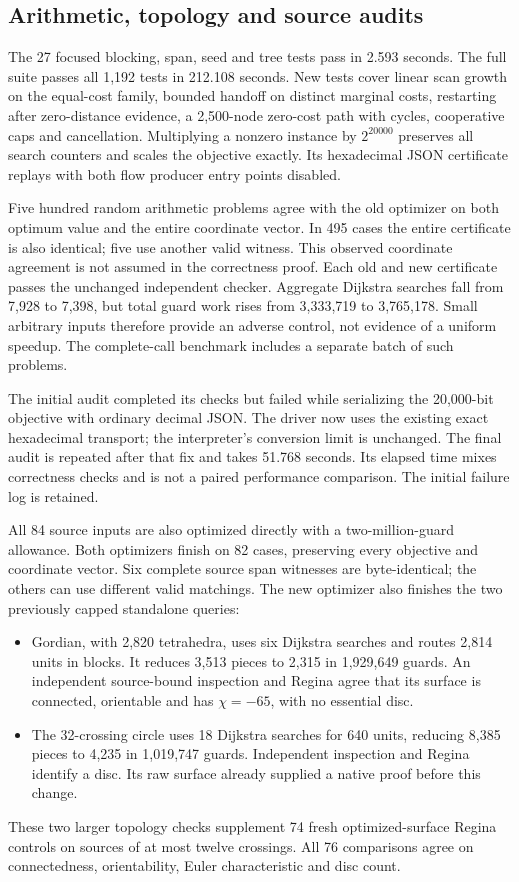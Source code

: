 \subsection{Arithmetic, topology and source audits}

The 27 focused blocking, span, seed and tree tests pass in 2.593 seconds.
The full suite passes all 1,192 tests in 212.108 seconds. New tests cover
linear scan growth on the equal-cost family, bounded handoff on distinct
marginal costs, restarting after zero-distance evidence, a 2,500-node
zero-cost path with cycles, cooperative caps and cancellation. Multiplying
a nonzero instance by $2^{20000}$ preserves all search counters and scales
the objective exactly. Its hexadecimal JSON certificate replays with both
flow producer entry points disabled.

Five hundred random arithmetic problems agree with the old optimizer on
both optimum value and the entire coordinate vector. In 495 cases the
entire certificate is also identical; five use another valid witness.
This observed coordinate agreement is not assumed in the
correctness proof. Each old and new certificate passes the unchanged
independent checker. Aggregate Dijkstra searches fall from 7,928 to 7,398,
but total guard work rises from 3,333,719 to 3,765,178. Small arbitrary
inputs therefore provide an adverse control, not evidence of a uniform
speedup. The complete-call benchmark includes a separate batch of such
problems.

The initial audit completed its checks but failed while serializing the
20,000-bit objective with ordinary decimal JSON. The driver now uses the
existing exact hexadecimal transport; the interpreter's conversion limit
is unchanged. The final audit is repeated after that fix and takes
51.768 seconds. Its elapsed time mixes correctness checks and is not a
paired performance comparison. The initial failure log is retained.

All 84 source inputs are also optimized directly with a two-million-guard
allowance. Both optimizers finish on 82 cases, preserving every objective
and coordinate vector. Six complete source span witnesses are byte-identical;
the others can use different valid matchings. The new optimizer also
finishes the two previously capped standalone queries:
\begin{itemize}
\item Gordian, with 2,820 tetrahedra, uses six Dijkstra searches and routes
      2,814 units in blocks. It reduces 3,513 pieces to 2,315 in 1,929,649
      guards. An independent source-bound inspection and Regina agree
      that its surface is connected, orientable and has $\chi=-65$,
      with no essential disc.
\item The 32-crossing circle uses 18 Dijkstra searches for 640 units,
      reducing 8,385 pieces to 4,235 in 1,019,747 guards. Independent
      inspection and Regina identify a disc. Its raw surface already
      supplied a native proof before this change.
\end{itemize}
These two larger topology checks supplement 74 fresh optimized-surface
Regina controls on sources of at most twelve crossings. All 76 comparisons
agree on connectedness, orientability, Euler characteristic and disc count.

